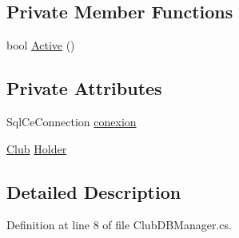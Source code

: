 \subsection*{Private Member Functions}
\begin{DoxyCompactItemize}
\item 
bool \hyperlink{class_asistencias__wpf_1_1_club_d_b_manager_a8d30f338a090ebf66923be98db072831}{Active} ()
\end{DoxyCompactItemize}
\subsection*{Private Attributes}
\begin{DoxyCompactItemize}
\item 
Sql\-Ce\-Connection \hyperlink{class_asistencias__wpf_1_1_club_d_b_manager_a61a2cc885a203121fabe30817fc97b76}{conexion}
\item 
\hyperlink{class_asistencias__wpf_1_1_club}{Club} \hyperlink{class_asistencias__wpf_1_1_club_d_b_manager_ab1863b4e35d108dd383a66ae76f8f0a8}{Holder}
\end{DoxyCompactItemize}


\subsection{Detailed Description}


Definition at line 8 of file Club\-D\-B\-Manager.\-cs.



